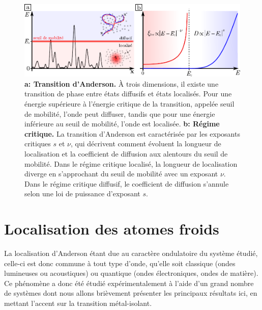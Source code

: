 \begin{figure}
\centering
\includegraphics[width=\textwidth]{Fig/Localisation/transition_anderson.pdf}
\caption{\textbf{a: Transition d'Anderson.} À trois dimensions, il existe une transition de phase entre états diffusifs et états localisés. Pour une énergie supérieure à l'énergie critique de la transition, appelée seuil de mobilité, l'onde peut diffuser, tandis que pour une énergie inférieure au seuil de mobilité, l'onde est localisée. \textbf{b: Régime critique.} La transition d'Anderson est caractérisée par les exposants critiques $s$ et $\nu$, qui décrivent comment évoluent la longueur de localisation et la coefficient de diffusion aux alentours du seuil de mobilité. Dans le régime critique localisé, la longueur de localisation diverge en s'approchant du seuil de mobilité avec un exposant $\nu$. Dans le régime critique diffusif, le coefficient de diffusion s'annule selon une loi de puissance d'exposant $s$. }
\label{fig:transition_anderson}
\end{figure}















\section{Localisation des atomes froids}
La localisation d'Anderson étant due au caractère ondulatoire du système étudié, celle-ci est donc commune à tout type d'onde, qu'elle soit classique (ondes lumineuses ou acoustiques) ou quantique (ondes électroniques, ondes de matière). Ce phénomène a donc été étudié expérimentalement à l'aide d'un grand nombre de systèmes dont nous allons brièvement présenter les principaux résultats ici, en mettant l'accent sur la transition métal-isolant.


